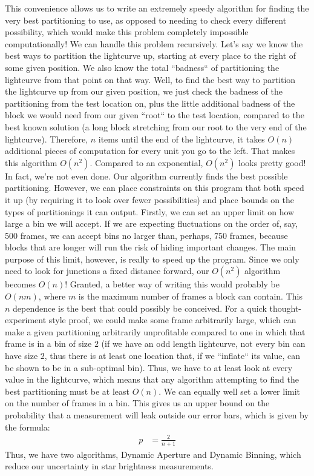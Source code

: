 \documentclass[12pt]{article}
\begin{document}
This convenience allows us to write an extremely speedy algorithm for finding the very best partitioning to use, as opposed to needing to check every different possibility, which would make this problem completely impossible computationally! We can handle this problem recursively. Let's say we know the best ways to partition the lightcurve up, starting at every place to the right of some given position. We also know the total ``badness`` of partitioning the lightcurve from that point on that way. Well, to find the best way to partition the lightcurve up from our given position, we just check the badness of the partitioning from the test location on, plus the little additional badness of the block we would need from our given ``root`` to the test location, compared to the best known solution (a long block stretching from our root to the very end of the lightcurve). Therefore, $ n $ items until the end of the lightcurve, it takes $ O \left ( n \right ) $ additional pieces of computation for every unit you go to the left. That makes this algorithm $ O \left ( n^{2} \right ) $. Compared to an exponential, $ O \left ( n^{2} \right ) $ looks pretty good!
\newline
\indent In fact, we're not even done. Our algorithm currently finds the best possible partitioning. However, we can place constraints on this program that both speed it up (by requiring it to look over fewer possibilities) and place bounds on the types of partitionings it can output. Firstly, we can set an upper limit on how large a bin we will accept. If we are expecting fluctuations on the order of, say, 500 frames, we can accept bins no larger than, perhaps, 750 frames, because blocks that are longer will run the risk of hiding important changes. The main purpose of this limit, however, is really to speed up the program. Since we only need to look for junctions a fixed distance forward, our $ O \left ( n^{2} \right ) $ algorithm becomes $ O \left ( n \right ) $! Granted, a better way of writing this would probably be $ O \left ( n m \right ) $, where $ m $ is the maximum number of frames a block can contain. This $ n $ dependence is the best that could possibly be conceived. For a quick thought-experiment style proof, we could make some frame arbitrarily large, which can make a given partitioning arbitrarily unprofitable compared to one in which that frame is in a bin of size $ 2 $ (if we have an odd length lightcurve, not every bin can have size $ 2 $, thus there is at least one location that, if we ``inflate`` its value, can be shown to be in a sub-optimal bin). Thus, we have to at least look at every value in the lightcurve, which means that any algorithm attempting to find the best partitioning must be at least $ O \left ( n \right ) $. 
\newline
\indent We can equally well set a lower limit on the number of frames in a bin. This gives us an upper bound on the probability that a measurement will leak outside our error bars, which is given by the formula:
\begin{align}
p & = \frac{2}{n + 1}
\end{align}
Thus, we have two algorithms, Dynamic Aperture and Dynamic Binning, which reduce our uncertainty in star brightness measurements.
\newline
\end{document}
